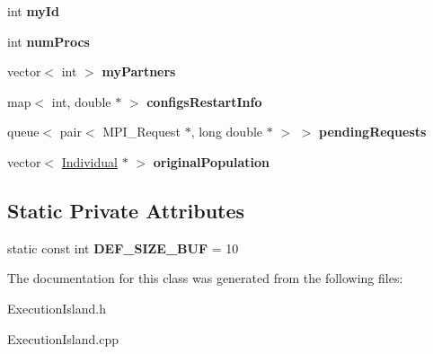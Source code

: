 \begin{DoxyCompactItemize}
int {\bfseries my\+Id}
\item 
\mbox{\label{classExecutionIsland_a33caade84ef9e6e5ab390d3f5228f606}} 
int {\bfseries num\+Procs}
\item 
\mbox{\label{classExecutionIsland_a51f38c60209e6c24be820381fc0a1965}} 
vector$<$ int $>$ {\bfseries my\+Partners}
\item 
\mbox{\label{classExecutionIsland_a63fe0b7e697e81a80ff2c3a594d26d02}} 
map$<$ int, double $\ast$ $>$ {\bfseries configs\+Restart\+Info}
\item 
\mbox{\label{classExecutionIsland_abf33ea9f3fcf127db9d6c3d35bb5f811}} 
queue$<$ pair$<$ M\+P\+I\+\_\+\+Request $\ast$, long double $\ast$ $>$ $>$ {\bfseries pending\+Requests}
\item 
\mbox{\label{classExecutionIsland_ab3b9f3eedc49ae903f502a09bf5a2fde}} 
vector$<$ \mbox{\hyperlink{classIndividual}{Individual}} $\ast$ $>$ {\bfseries original\+Population}
\end{DoxyCompactItemize}
\subsection*{Static Private Attributes}
\begin{DoxyCompactItemize}
\item 
\mbox{\label{classExecutionIsland_ab6a3bccbb5b13ca7557b49c7204386eb}} 
static const int {\bfseries D\+E\+F\+\_\+\+S\+I\+Z\+E\+\_\+\+B\+UF} = 10
\end{DoxyCompactItemize}


The documentation for this class was generated from the following files\+:\begin{DoxyCompactItemize}
\item 
Execution\+Island.\+h\item 
Execution\+Island.\+cpp\end{DoxyCompactItemize}
